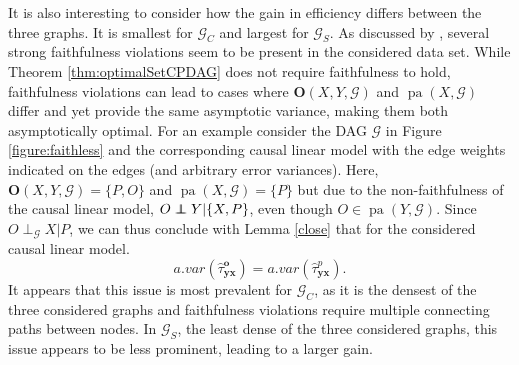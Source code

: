 \documentclass[11pt,a4paper]{article}
\theoremstyle{definition}
\theoremstyle{remark}
\newcommand\ci{\protect\mathpalette{\protect\independenT}{\perp}}
\def\independenT#1#2{\mathrel{\rlap{$#1#2$}\mkern2mu{#1#2}}}
\DeclareMathOperator{\pa}{pa}
\newcommand{\g}[1][G]{\mathcal{#1}}
\newcommand{\opt}[2][X,Y]{\mathbf{O}(#1,#2)}
\begin{document}
It is also interesting to consider how the gain in efficiency differs between the three graphs. It is smallest for $\g_C$ and largest for $\g_S$. 
As discussed by \citet{mooij2013cyclic}, several strong faithfulness violations seem to be present in the considered data set. While Theorem \ref{thm:optimalSetCPDAG} does not require faithfulness to hold, faithfulness violations can lead to cases where $\opt{\g}$ and $\pa(X,\g)$ differ and yet provide the same asymptotic variance, making them both asymptotically optimal. For an example consider the DAG $\g$ in Figure \ref{figure:faithless} and the corresponding causal linear model with the edge weights indicated on the edges (and arbitrary error variances). Here, $\opt{\g}=\{P,O\}$ and $\pa(X,\g)=\{P\}$ but due to the non-faithfulness of the causal linear model, $O \ci Y | \{X,P\}$, even though $O \in \pa(Y,\g)$. Since $O \perp_{\g} X | P$, we can thus conclude with Lemma \ref{close} that for the considered causal linear model.
\[a.var(\hat{\tau}_{\mathbf{yx}}^{\mathbf{o}}) =
a.var(\hat{\tau}_{\mathbf{yx}}^{p}).\]
It appears that this issue is most prevalent for $\g_C$, as it is the densest of the three considered graphs and faithfulness violations require multiple connecting paths between nodes. In $\g_S$,  the least dense of the three considered graphs, this issue appears to be less prominent, leading to a larger gain. 






\end{document}

